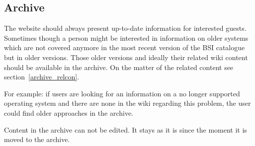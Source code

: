 \subsection{Archive} 
\label{archive}
The website should always present up-to-date information for interested guests.
Sometimes though a person might be interested in information on older systems which are not covered anymore in the most recent version of the BSI catalogue but in older versions.
Those older versions and ideally their related wiki content should be available in the archive. 
On the matter of the related content see section~\ref{archive_relcon}.

For example: if users are looking for an information on a no longer supported operating system and there are none in the wiki regarding this problem, the user could find older approaches in the archive. 

\begin{tcolorbox}[breakable,colback=red!14,colframe=red!40!black,title=UPDATE 19/11/2017]
Content in the archive can not be edited.
It stays as it is since the moment it is moved to the archive.
\end{tcolorbox}


